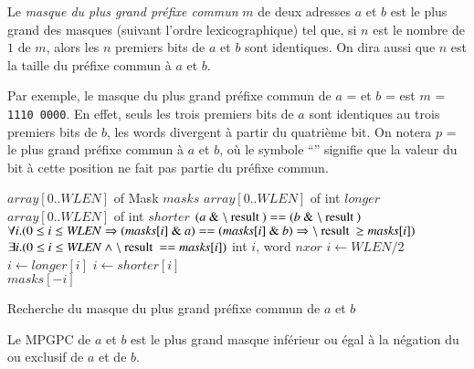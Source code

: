 Le {\em masque du plus grand préfixe commun} $m$ de deux adresses $a$ et $b$ est
le plus grand des masques (suivant l'ordre lexicographique) tel que, si $n$ est
le nombre de $1$ de $m$, alors les $n$ premiers bits de $a$ et $b$ sont
identiques.
On dira aussi que $n$ est la taille du préfixe commun à $a$ et $b$.

Par exemple, le masque du plus grand préfixe commun de $a$ =
 et $b$ =  est
$m$ = \texttt{1110\,0000}.
En effet, seuls les trois premiers bits de $a$ sont identiques au trois premiers
bits de $b$, les words divergent à partir du quatrième bit.
On notera $p$ =  le plus grand préfixe commun à $a$
et $b$, où le symbole ``{\tt *}'' signifie que la valeur du bit à cette position
ne fait pas partie du préfixe commun.


\begin{algorithm}
\begin{algorithmic}[1]
\Statex $array[ 0 .. \mathit{WLEN} ]$ of Mask $\mathit{masks}$
\Statex $array[ 0 .. \mathit{WLEN} ]$ of int $\mathit{longer}$
\Statex $array[ 0 .. \mathit{WLEN} ]$ of int $\mathit{shorter}$
\Statex
\Ensure $(a \Band \mresult) == (b \Band \mresult)$
\Ensure $\forall i. (0 \le i \le \mathit{WLEN} \Rightarrow (\mathit{masks}[i] \Band a) == (\mathit{masks}[i] \Band b) \Rightarrow \mresult \ge \mathit{masks}[i])$
\Ensure $\exists i. (0 \le i \le \mathit{WLEN} \land \mresult == \mathit{masks}[i])$
\Statex
{}
\State int $i$, word $nxor$
\State $i \gets \mathit{WLEN}/2$
    \State $i \gets \mathit{longer}[i]$ 
  \Else
    \State $i \gets \mathit{shorter}[i]$
  \EndIf
\EndWhile\\
\Return $masks[-i]$
\EndFunction
\end{algorithmic}
\caption{Recherche du masque du plus grand préfixe commun de $a$ et $b$
  \label{algo:prefix}}
\end{algorithm}

\begin{definition}
  Le MPGPC de $a$ et $b$ est le plus grand masque inférieur ou égal à la
  négation du ou exclusif de $a$ et de $b$.
\end{definition}

